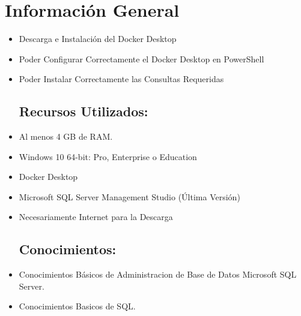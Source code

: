 \section{Información General}

	\begin{itemize}
		\subsection{Objetivos:}
			\item Descarga e Instalación del Docker Desktop
			 \item Poder Configurar Correctamente el Docker Desktop en PowerShell
			 \item Poder Instalar Correctamente las Consultas Requeridas
		\subsection{Recursos Utilizados:}
			\item Al menos 4 GB de RAM.
			\item Windows 10 64-bit: Pro, Enterprise o Education
			\item Docker Desktop
			\item Microsoft SQL Server Management Studio (Última Versión)
			\item Necesariamente Internet para la Descarga
		\subsection{Conocimientos:}
			\item Conocimientos Básicos de Administracion de Base de Datos Microsoft SQL Server.
			\item Conocimientos Basicos de SQL.
	\end{itemize}